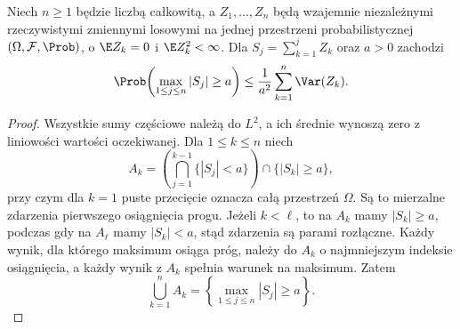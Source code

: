 \begin{twierdzenie}
Niech $n\geq1$ będzie liczbą całkowitą, a
$Z_1,\ldots,Z_n$ będą wzajemnie niezależnymi rzeczywistymi
zmiennymi losowymi na jednej przestrzeni probabilistycznej
$(\Omega,\mathcal F,\Prob)$,
o $\E Z_k=0$ i $\E Z_k^2<\infty$.
Dla $S_j=\sum_{k=1}^j Z_k$ oraz $a>0$ zachodzi
\[
\Prob\!\left(\max_{1\leq j\leq n}|S_j|\geq a\right)
\leq\frac1{a^2}\sum_{k=1}^n\Var(Z_k).
\]
\end{twierdzenie}
\begin{proof}
Wszystkie sumy częściowe należą do $L^2$, a ich
średnie wynoszą zero z liniowości wartości oczekiwanej.
Dla $1\leq k\leq n$ niech
\[
A_k=\left(\bigcap_{j=1}^{k-1}\{|S_j|<a\}\right)
\cap\{|S_k|\geq a\},
\]
przy czym dla $k=1$ puste przecięcie oznacza całą
przestrzeń $\Omega$. Są to mierzalne zdarzenia pierwszego
osiągnięcia progu. Jeżeli $k<\ell$, to na $A_k$
mamy $|S_k|\geq a$, podczas gdy na $A_\ell$ mamy
$|S_k|<a$, stąd zdarzenia są parami rozłączne.
Każdy wynik, dla którego maksimum osiąga próg,
należy do $A_k$ o najmniejszym indeksie osiągnięcia,
a każdy wynik z $A_k$ spełnia warunek na maksimum.
Zatem
\[
\bigcup_{k=1}^n A_k
=\left\{\max_{1\leq j\leq n}|S_j|\geq a\right\}.
\]


\end{proof}
